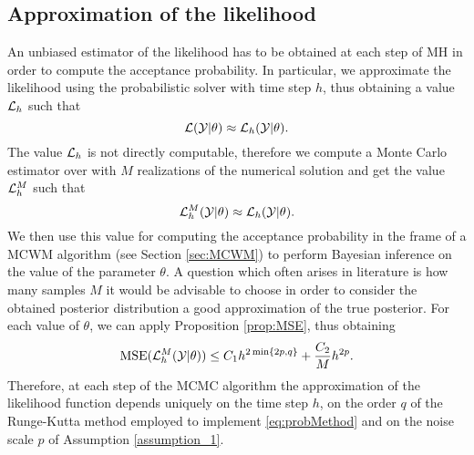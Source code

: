 \subsection{Approximation of the likelihood}

An unbiased estimator of the likelihood has to be obtained at each step of MH in order to compute the acceptance probability. In particular, we approximate the likelihood using the probabilistic solver with time step $h$, thus obtaining a value $\mathcal{L}_h$ such that
\begin{equation}
	\mathcal{L}(\mathcal Y|\theta) \approx \mathcal{L}_h(\mathcal Y|\theta).
\end{equation}
The value $\mathcal{L}_h$ is not directly computable, therefore we compute a Monte Carlo estimator over with $M$ realizations of the numerical solution and get the value $\mathcal{L}_h^M$ such that
\begin{equation}
	\mathcal{L}_h^M (\mathcal Y | \theta)  \approx \mathcal{L}_h(\mathcal Y|\theta).
\end{equation}
We then use this value for computing the acceptance probability in the frame of a MCWM algorithm (see Section \ref{sec:MCWM}) to perform Bayesian inference on the value of the parameter $\theta$. A question which often arises in literature \cite{ADH10, DPD15, PSG12} is how many samples $M$ it would be advisable to choose in order to consider the obtained posterior distribution a good approximation of the true posterior. For each value of $\theta$, we can apply Proposition \ref{prop:MSE}, thus obtaining 
\begin{equation}\label{eq:likMSE}
	\operatorname{MSE}(\mathcal{L}_h^M (\mathcal Y | \theta)) \leq C_1 h^{2\min\{2p, q\}} + \frac{C_2}{M} h^{2p}.
\end{equation}
Therefore, at each step of the MCMC algorithm the approximation of the likelihood function depends uniquely on the time step $h$, on the order $q$ of the Runge-Kutta method employed to implement \eqref{eq:probMethod} and on the noise scale $p$ of Assumption \ref{assumption_1}.
